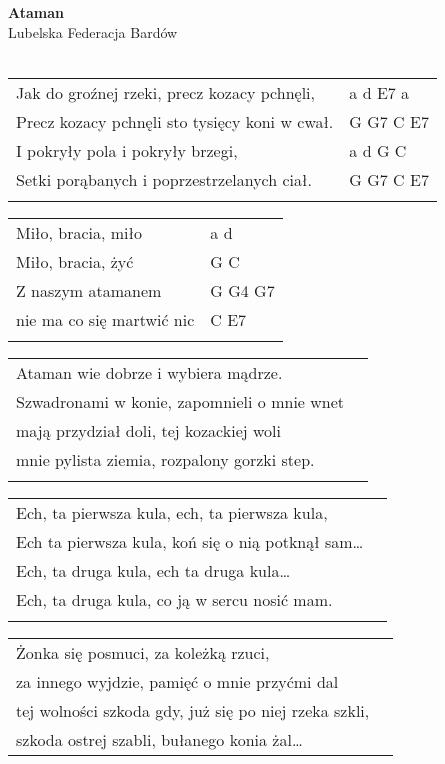 \documentclass[a5paper]{article}
\begin{document}


\noindent
\fontsize{12pt}{15pt}\selectfont
\textbf{Ataman} \\
\fontsize{8pt}{10pt}\selectfont
Lubelska Federacja Bardów \\ \\
\fontsize{10pt}{12pt}\selectfont
{}
\begin{tabular}{@{}p{9cm}p{3cm}@{}}
\noindent
Jak do groźnej rzeki, precz kozacy pchnęli, & a d E7 a \\
Precz kozacy pchnęli sto tysięcy koni w cwał. & G G7 C E7 \\
I pokryły pola i pokryły brzegi, & a d G C \\
Setki porąbanych i poprzestrzelanych ciał. & G G7 C E7 \\ \\
\end{tabular}

\noindent
\begin{tabular}{@{}p{7cm}p{3cm}@{}}
Miło, bracia, miło & a d \\
Miło, bracia, żyć & G C \\
Z naszym atamanem & G G4 G7 \\
nie ma co się martwić nic & C E7 \\ \\
\end{tabular}

\noindent
\begin{tabular}{@{}p{8.5cm}p{3cm}@{}}
Ataman wie dobrze i wybiera mądrze.\\
Szwadronami w konie, zapomnieli o mnie wnet\\
mają przydział doli, tej kozackiej woli\\
mnie pylista ziemia, rozpalony gorzki step.\\\\
\end{tabular}

\noindent
\begin{tabular}{@{}p{8.5cm}p{3cm}@{}}
Ech, ta pierwsza kula, ech, ta pierwsza kula,\\
Ech  ta pierwsza kula, koń się o nią potknął sam… \\
Ech, ta druga kula, ech ta druga kula… \\
Ech, ta druga kula, co ją w sercu nosić mam. \\ \\
\end{tabular}

\noindent
\begin{tabular}{@{}p{8.5cm}p{3cm}@{}}
Żonka się posmuci, za koleżką rzuci,\\
za innego wyjdzie, pamięć o mnie przyćmi dal\\
tej wolności szkoda gdy, już się po niej rzeka szkli,\\
szkoda ostrej szabli, bułanego konia żal…
\end{tabular}
\end{document}
